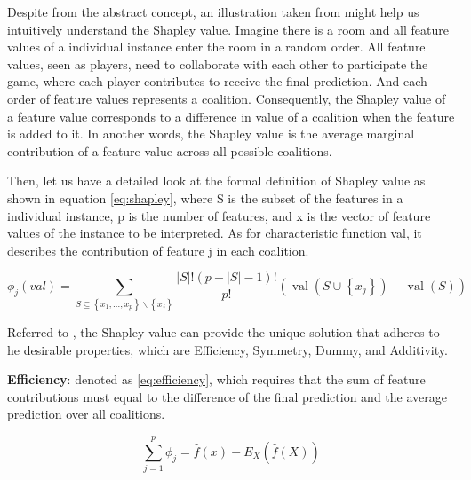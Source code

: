 Despite from the abstract concept, an illustration taken from \cite{molnar2019} might help us intuitively understand the Shapley value. Imagine there is a room and all feature values of a individual instance enter the room in a random order. All feature values, seen as players, need to collaborate with each other to participate the game, where each player contributes to receive the final prediction. And each order of feature values represents a coalition. Consequently, the Shapley value of a feature value corresponds to a difference in value of a coalition when the feature is added to it. In another words, the Shapley value is the average marginal contribution of a feature value across all possible coalitions. 

Then, let us have a detailed look at the formal definition of Shapley value as shown in equation \ref{eq:shapley}, where S is the subset of the features in a individual instance, p is the number of features, and x is the vector of feature values of the instance to be interpreted. As for characteristic function val, it describes the contribution of feature j in each coalition.




\begin{equation} \label{eq:shapley}
\phi_{j}(v a l)=\sum_{S \subseteq\left\{x_{1}, \ldots, x_{p}\right\} \backslash\left\{x_{j}\right\}} \frac{|S| !(p-|S|-1) !}{p !}\left(\operatorname{val}\left(S \cup\left\{x_{j}\right\}\right)-\operatorname{val}(S)\right)
\end{equation}

Referred to \cite{shapley1953value}, the Shapley value can provide the unique solution that adheres to he desirable properties, which are Efficiency, Symmetry, Dummy, and Additivity.

\textbf{Efficiency}: denoted as \ref*{eq:efficiency}, which requires that the sum of feature contributions must equal to the difference of the final prediction and the average prediction over all coalitions. 

\begin{equation} \label{eq:efficiency}
\sum_{j=1}^{p} \phi_{j}=\hat{f}(x)-E_{X}(\hat{f}(X))
\end{equation}

